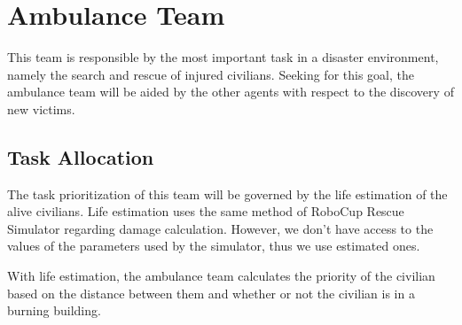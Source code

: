 \section{Ambulance Team}
\label{sec:ambulance}

This team is responsible by the most important task in a disaster environment, namely the search and rescue of injured civilians. Seeking for this goal, the ambulance team will be aided by the other agents with respect to the discovery of new victims.


\subsection{Task Allocation}

The task prioritization of this team will be governed by the life estimation of the alive civilians. Life estimation uses the same method of RoboCup Rescue Simulator regarding damage calculation. However, we don't have access to the values of the parameters used by the simulator, thus we use estimated ones.

With life estimation, the ambulance team calculates the priority of the civilian based on the distance between them and whether or not the civilian is in a burning building.


